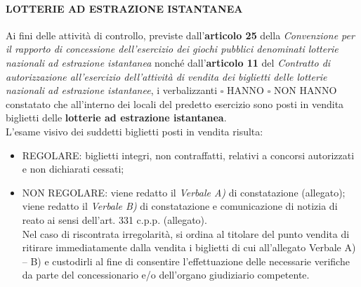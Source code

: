 \documentclass[12pt]{article}
\begin{document}
\paragraph{LOTTERIE AD ESTRAZIONE ISTANTANEA}
Ai fini delle attività di controllo, previste dall’\textbf{articolo 25} della \textit{Convenzione per il rapporto di concessione dell’esercizio dei giochi pubblici denominati lotterie nazionali ad estrazione istantanea} nonché dall’\textbf{articolo 11} del \textit{Contratto di autorizzazione all’esercizio dell’attività di vendita dei biglietti delle lotterie nazionali ad estrazione istantanee}, i verbalizzanti
\begin{math}\square\end{math} HANNO \begin{math}\square\end{math} NON HANNO
constatato che all’interno dei locali del predetto esercizio sono posti in vendita biglietti delle \textbf{lotterie ad estrazione istantanea}.\\
L'esame visivo dei suddetti biglietti posti in vendita risulta:
\begin{itemize}[label={\begin{math}\square\end{math}}]
    \item REGOLARE: biglietti integri, non contraffatti, relativi a concorsi autorizzati e non dichiarati cessati;
    \item NON REGOLARE: viene redatto il \textit{Verbale A)} di constatazione (allegato);\\ viene redatto il \textit{Verbale B)} di constatazione e comunicazione di notizia di reato ai sensi dell'art. 331 c.p.p. (allegato).\\
    Nel caso di riscontrata irregolarità, si ordina al titolare del punto vendita di ritirare immediatamente dalla vendita i biglietti di cui all’allegato Verbale A) – B) e custodirli al fine di consentire l’effettuazione delle necessarie verifiche da parte del concessionario e/o dell’organo giudiziario competente.
\end{itemize}
\end{document}
